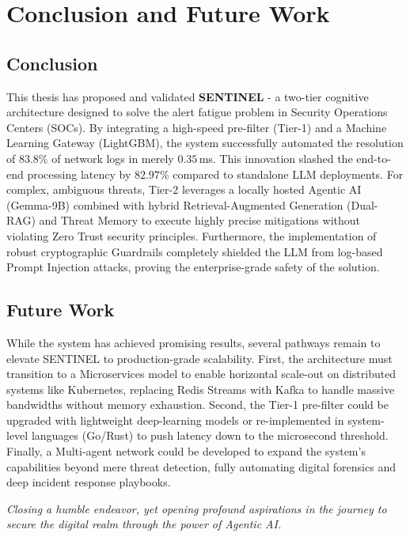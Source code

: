 \chapter{Conclusion and Future Work}
\label{ch:conclusion}

\section{Conclusion}
This thesis has proposed and validated \textbf{SENTINEL} - a two-tier cognitive architecture designed to solve the alert fatigue problem in Security Operations Centers (SOCs). By integrating a high-speed pre-filter (Tier-1) and a Machine Learning Gateway (LightGBM), the system successfully automated the resolution of $83.8\%$ of network logs in merely $0.35$\,ms. This innovation slashed the end-to-end processing latency by $82.97\%$ compared to standalone LLM deployments.
For complex, ambiguous threats, Tier-2 leverages a locally hosted Agentic AI (Gemma-9B) combined with hybrid Retrieval-Augmented Generation (Dual-RAG) and Threat Memory to execute highly precise mitigations without violating Zero Trust security principles. Furthermore, the implementation of robust cryptographic Guardrails completely shielded the LLM from log-based Prompt Injection attacks, proving the enterprise-grade safety of the solution.

\section{Future Work}
While the system has achieved promising results, several pathways remain to elevate SENTINEL to production-grade scalability.
First, the architecture must transition to a Microservices model to enable horizontal scale-out on distributed systems like Kubernetes, replacing Redis Streams with Kafka to handle massive bandwidths without memory exhaustion.
Second, the Tier-1 pre-filter could be upgraded with lightweight deep-learning models or re-implemented in system-level languages (Go/Rust) to push latency down to the microsecond threshold.
Finally, a Multi-agent network could be developed to expand the system's capabilities beyond mere threat detection, fully automating digital forensics and deep incident response playbooks.

\vspace{0.6cm}
\begin{flushright}
    \textit{Closing a humble endeavor, yet opening profound aspirations in the journey to secure the digital realm through the power of Agentic AI.}
\end{flushright}
